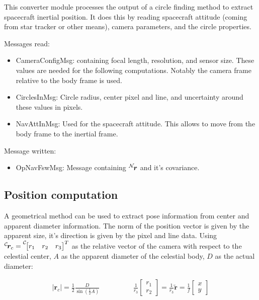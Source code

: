 This converter module processes the output of a circle finding method to extract spacecraft inertial position. It does this by reading spacecraft attitude (coming from star tracker or other means), camera parameters, and the circle properties. 

Messages read:

\begin{itemize}
\item CameraConfigMsg: containing focal length, resolution, and sensor size. These values are needed for the following computations. Notably the camera frame relative to the body frame is used.
\item CirclesInMsg: Circle radius, center pixel and line, and uncertainty around these values in pixels. 
\item NavAttInMsg: Used for the spacecraft attitude. This allows to move from the body frame to the inertial frame.
\end{itemize}

Message written:
\begin{itemize}
\item OpNavFswMsg: Message containing $\leftexp{N}{\bm r}$ and it's covariance.
\end{itemize}

\subsection{Position computation}

A geometrical method can be used to extract pose information from center and apparent diameter information. The norm of the position vector is given by the apparent size, it's direction is given by the pixel and line data. Using $\leftexp{C}{\bm r_c} = \leftexp{C}{\begin{bmatrix} r_1 & r_2 & r_3 \end{bmatrix}}^T$ as the relative vector of the camera with respect to the celestial center, $A$ as the apparent diameter of the celestial body, $D$ as the actual diameter:

\begin{align}\label{eq:cad}
|\bm r_c| = \frac{1}{2}\frac{D}{\sin\left(\frac{1}{2} A\right)} \hspace{2cm} \frac{1}{r_3}\begin{bmatrix} r_1 \\ r_2 \end{bmatrix}= \frac{1}{r_3}\tilde{\bm r} = \frac{1}{f}\begin{bmatrix} x \\ y \end{bmatrix}
\end{align}


